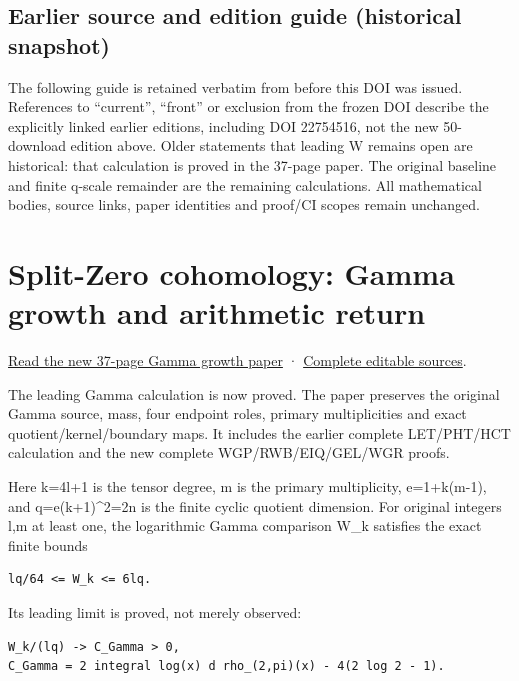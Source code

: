 \documentclass[
]{article}
\begin{document}
\subsection{Earlier source and edition guide (historical
snapshot)}\label{earlier-source-and-edition-guide-historical-snapshot-19}

The following guide is retained verbatim from before this DOI was
issued. References to ``current'', ``front'' or exclusion from the
frozen DOI describe the explicitly linked earlier editions, including
DOI 22754516, not the new 50-download edition above. Older statements
that leading W remains open are historical: that calculation is proved
in the 37-page paper. The original baseline and finite q-scale remainder
are the remaining calculations. All mathematical bodies, source links,
paper identities and proof/CI scopes remain unchanged.

\section{Split-Zero cohomology: Gamma growth and arithmetic
return}\label{split-zero-cohomology-gamma-growth-and-arithmetic-return-1}

\href{workbenches/splitzero-tandem/continuations/20260914-gamma-growth/Gamma_Growth_and_Arithmetic_Return.pdf}{Read
the new 37-page Gamma growth paper} ·
\href{workbenches/splitzero-tandem/continuations/20260914-gamma-growth/README.md}{Complete
editable sources}.

The leading Gamma calculation is now proved. The paper preserves the
original Gamma source, mass, four endpoint roles, primary multiplicities
and exact quotient/kernel/boundary maps. It includes the earlier
complete LET/PHT/HCT calculation and the new complete
WGP/RWB/EIQ/GEL/WGR proofs.

Here k=4l+1 is the tensor degree, m is the primary multiplicity,
e=1+k(m-1), and q=e(k+1)\^{}2=2n is the finite cyclic quotient
dimension. For original integers l,m at least one, the logarithmic Gamma
comparison W\_k satisfies the exact finite bounds

\begin{verbatim}
lq/64 <= W_k <= 6lq.
\end{verbatim}

Its leading limit is proved, not merely observed:

\begin{verbatim}
W_k/(lq) -> C_Gamma > 0,
C_Gamma = 2 integral log(x) d rho_(2,pi)(x) - 4(2 log 2 - 1).
\end{verbatim}
\end{document}
